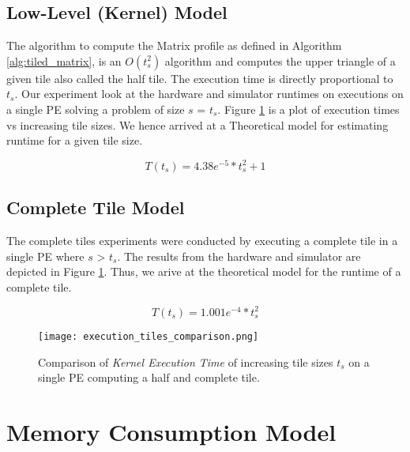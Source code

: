 \subsection{Low-Level (Kernel) Model} \label{subsection:low_level_model}

The algorithm to compute the Matrix profile as defined in Algorithm \ref{alg:tiled_matrix}, is an \(O(t_{s}^2)\) algorithm and computes the upper triangle of a given tile also called the half tile. The execution time is directly proportional to $t_s$. Our experiment look at the hardware and simulator runtimes on executions on a single PE solving a problem of size $s$ = $t_s$. Figure \ref{fig:execution_tiles_comparison} is a plot of execution times vs increasing tile sizes. We hence arrived at a Theoretical model for estimating runtime for a given tile size.

\begin{equation}
    T(t_s) = 4.38e^{-5} * t_s^2 + 1
    \label{eq:half_tile_execution}
\end{equation}

\subsection{Complete Tile Model} \label{subsection:complete_tile_model}

The complete tiles experiments were conducted by executing a complete tile in a single PE where $s$ > $t_s$. The results from the hardware and simulator are depicted in Figure \ref{fig:execution_tiles_comparison}. Thus, we arive at the theoretical model for the runtime of a complete tile. 

\begin{equation}
    T(t_s) = 1.001e^{-4} * t_s^2
    \label{eq:full_tile_execution}
\end{equation}

\begin{figure}[h!]
    \texttt{[image: execution\_tiles\_comparison.png]}
    \centering
    \caption{Comparison of \textit{Kernel Execution Time} of increasing tile sizes $t_s$ on a single PE computing a half and complete tile.}
    \label{fig:execution_tiles_comparison}
\end{figure}

\section{Memory Consumption Model} \label{section:memory_consumption}

